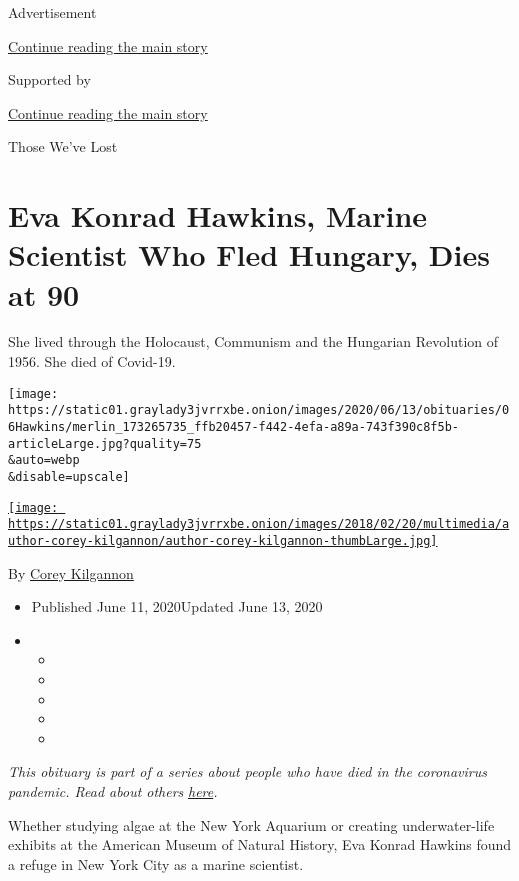 Advertisement

\protect\hyperlink{after-top}{Continue reading the main story}

Supported by

\protect\hyperlink{after-sponsor}{Continue reading the main story}

Those We've Lost

\hypertarget{eva-konrad-hawkins-marine-scientist-who-fled-hungary-dies-at-90}{%
\section{Eva Konrad Hawkins, Marine Scientist Who Fled Hungary, Dies at
90}\label{eva-konrad-hawkins-marine-scientist-who-fled-hungary-dies-at-90}}

She lived through the Holocaust, Communism and the Hungarian Revolution
of 1956. She died of Covid-19.

\texttt{[image: https://static01.graylady3jvrrxbe.onion/images/2020/06/13/obituaries/06Hawkins/merlin\_173265735\_ffb20457-f442-4efa-a89a-743f390c8f5b-articleLarge.jpg?quality=75\\\&auto=webp\\\&disable=upscale]}

\href{https://www.nytimes3xbfgragh.onion/by/corey-kilgannon}{\texttt{[image: https://static01.graylady3jvrrxbe.onion/images/2018/02/20/multimedia/author-corey-kilgannon/author-corey-kilgannon-thumbLarge.jpg]}}

By \href{https://www.nytimes3xbfgragh.onion/by/corey-kilgannon}{Corey
Kilgannon}

\begin{itemize}
\item
  Published June 11, 2020Updated June 13, 2020
\item
  \begin{itemize}
  \item
  \item
  \item
  \item
  \item
  \end{itemize}
\end{itemize}

\emph{This obituary is part of a series about people who have died in
the coronavirus pandemic. Read about others}
\href{https://www.nytimes3xbfgragh.onion/interactive/2020/obituaries/people-died-coronavirus-obituaries.html}{\emph{here}}\emph{.}

Whether studying algae at the New York Aquarium or creating
underwater-life exhibits at the American Museum of Natural History, Eva
Konrad Hawkins found a refuge in New York City as a marine scientist.

